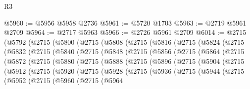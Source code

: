 \begin{lexlean}{R3}
\begin{coremodule}
@5960 := @5956 @5958 @2736
@5961 := @5720 @1703
@5963 := @2719 @5961 @2709
@5964 := @2717 @5963
@5966 := @2726 @5961 @2709
@6014 := @2715
    (@5792
      (@2715
        (@5800
          (@2715
            (@5808
              (@2715
                (@5816
                  (@2715
                    (@5824
                      (@2715
                        (@5832
                          (@2715
                            (@5840
                              (@2715
                                (@5848
                                  (@2715
                                    (@5856
                                      (@2715
                                        (@5864
                                          (@2715
                                            (@5872
                                              (@2715
                                                (@5880
                                                  (@2715
                                                    (@5888
                                                      (@2715
                                                        (@5896
                                                          (@2715
                                                            (@5904
                                                              (@2715
                                                                (@5912
                                                                  (@2715
                                                                    (@5920
                                                                      (@2715
                                                                        (@5928
                                                                          (@2715
                                                                            (@5936
                                                                              (@2715
                                                                                (@5944
                                                                                  (@2715
                                                                                    (@5952
                                                                                      (@2715
                                                                                        (@5960
                                                                                          (@2715
                                                                                            (@5964

\end{coremodule}
\end{lexlean}
